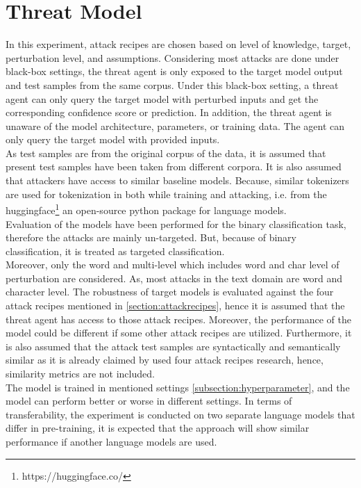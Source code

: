 \documentclass[%
	BCOR=8mm, %
	DIV=12,
	toc=bibliography, %
	toc=listof, %
	oneside, %
	egregdoesnotlikesansseriftitles, %
	]{scrbook}
\begin{document}
\section{Threat Model}
\label{section:threadmodel}
In this experiment, attack recipes are chosen based on level of knowledge, target, perturbation level, and assumptions. Considering most attacks are done under black-box settings, the threat agent is only exposed to the target model output and test samples from the same corpus. Under this black-box setting, a threat agent can only query the target model with perturbed inputs and get the corresponding confidence score or prediction. In addition, the threat agent is unaware of the model architecture, parameters, or training data. The agent can only query the target model with provided inputs. \\
As test samples are from the original corpus of the data, it is assumed that present test samples have been taken from different corpora. It is also assumed that attackers have access to similar baseline models. Because, similar tokenizers are used for tokenization in both while training and attacking, i.e. from the huggingface\footnote{https://huggingface.co/} an open-source python package for language models.\\
Evaluation of the models have been performed for the binary classification task, therefore the attacks are mainly un-targeted. But, because of binary classification, it is treated as targeted classification. \\
Moreover, only the word and multi-level which includes word and char level of perturbation are considered. As, most attacks in the text domain are word and character level.
The robustness of target models is evaluated against the four attack recipes mentioned in \ref{section:attackrecipes}, hence it is assumed that the threat agent has access to those attack recipes. Moreover, the performance of the model could be different if some other attack recipes are utilized. Furthermore, it is also assumed that the attack test samples are syntactically and semantically similar as it is already  claimed by used four attack recipes research, hence, similarity metrics are not included.\\
 The model is trained in mentioned settings  \ref{subsection:hyperparameter}, and the model can perform better or worse in different settings. In terms of transferability, the experiment is conducted on two separate language models that differ in pre-training, it is expected that the approach will show similar performance if another language models are used. 
\end{document}
